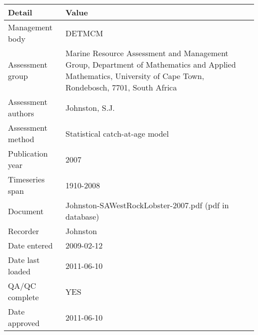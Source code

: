 \begin{table}[htb]
\centering
\begin{tabular}{lp{7cm}}
\toprule
Detail & Value \\
\midrule
Management body    & DETMCM                                                                                                                                                      \\
Assessment group   & Marine Resource Assessment and Management Group, Department of Mathematics and Applied Mathematics, University of Cape Town, Rondebosch, 7701, South Africa \\
Assessment authors & Johnston, S.J.                                                                                                                                              \\
Assessment method  & Statistical catch-at-age model                                                                                                                              \\
Publication year   & 2007                                                                                                                                                        \\
Timeseries span    & 1910-2008                                                                                                                                                   \\
Document           & Johnston-SAWestRockLobster-2007.pdf (pdf in database)                                                                                                       \\
Recorder           & Johnston                                                                                                                                                    \\
Date entered       & 2009-02-12                                                                                                                                                  \\
Date last loaded   & 2011-06-10                                                                                                                                                  \\
QA/QC complete     & YES                                                                                                                                                         \\
Date approved      & 2011-06-10                                                                                                                                                  \\
\bottomrule
\end{tabular}
\label{tab:assessdet}
\end{table}
